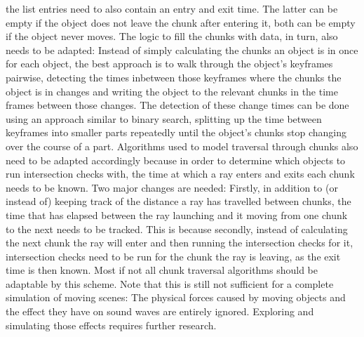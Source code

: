 the list entries need to also contain an entry and exit time.
The latter can be empty if the object does not leave the chunk after entering it,
both can be empty if the object never moves.
\newline
The logic to fill the chunks with data, in turn, also needs to be adapted:
Instead of simply calculating the chunks an object is in once for each object,
the best approach is to walk through the object's keyframes pairwise,
detecting the times inbetween those keyframes where the chunks the object is in changes
and writing the object to the relevant chunks in the time frames between those changes.
The detection of these change times can be done using an approach similar to binary search,
splitting up the time between keyframes into smaller parts repeatedly
until the object's chunks stop changing over the course of a part.
\newline
Algorithms used to model traversal through chunks also need to be adapted accordingly
because in order to determine which objects to run intersection checks with,
the time at which a ray enters and exits each chunk needs to be known.
\newline
Two major changes are needed:
Firstly, in addition to (or instead of) keeping track of the distance a ray has travelled between chunks,
the time that has elapsed between the ray launching and it moving from one chunk to the next needs to be tracked.
This is because secondly, instead of calculating the next chunk the ray will enter and then running the intersection checks for it,
intersection checks need to be run for the chunk the ray is leaving, as the exit time is then known.
\newline
Most if not all chunk traversal algorithms should be adaptable by this scheme.
\newline
Note that this is still not sufficient for a complete simulation of moving scenes:
The physical forces caused by moving objects and the effect they have on sound waves are entirely ignored.
Exploring and simulating those effects requires further research.
